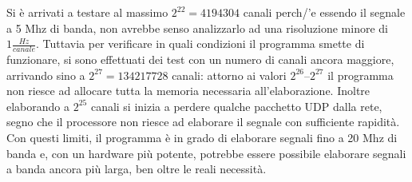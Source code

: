 Si \`e arrivati a testare al massimo $2^{22} = 4194304$ canali perch/'e essendo il
segnale a 5 Mhz di banda, non avrebbe senso analizzarlo ad una risoluzione
minore di $1 \frac{Hz}{canale}$. Tuttavia per verificare in quali condizioni il
programma smette di funzionare, si sono effettuati dei test con un numero di
canali ancora maggiore, arrivando sino a $2^{27} = 134217728$ canali: attorno ai
valori $2^{26}$--$2^{27}$ il programma non riesce ad allocare tutta la memoria
necessaria all'elaborazione. Inoltre elaborando a $2^{25}$ canali si inizia a
perdere qualche pacchetto UDP dalla rete, segno che il processore non riesce ad
elaborare il segnale con sufficiente rapidit\`a. Con questi limiti, il programma
\`e in grado di elaborare segnali fino a 20 Mhz di banda e, con un hardware
pi\`u potente, potrebbe essere possibile elaborare segnali a banda ancora pi\`u
larga, ben oltre le reali necessit\`a.
